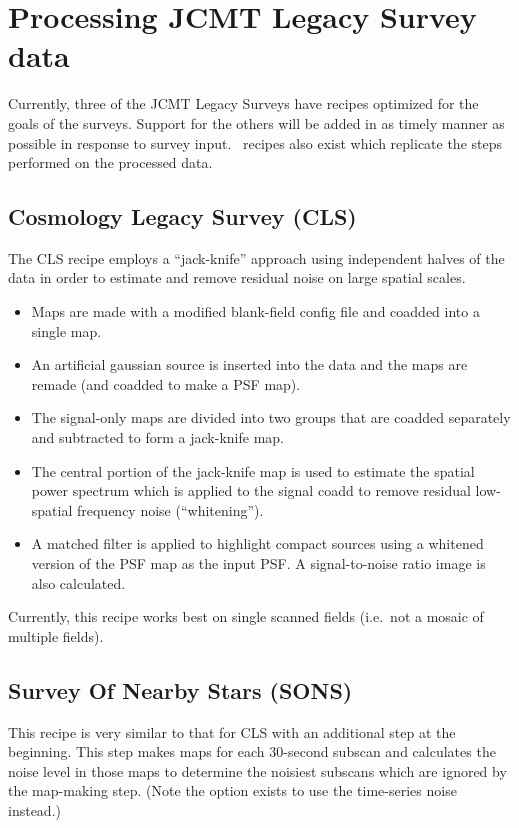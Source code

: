\section{Processing JCMT Legacy Survey data\label{se:jlsrec}}

Currently, three of the JCMT Legacy Surveys have recipes optimized for
the goals of the surveys. Support for the others will be added in as
timely manner as possible in response to survey
input. \picard\ recipes also exist which replicate the steps performed
on the processed data.

\subsection{Cosmology Legacy Survey (CLS)}

The CLS recipe employs a ``jack-knife'' approach using independent
halves of the data in order to estimate and remove residual noise on
large spatial scales.

\begin{itemize}
\item Maps are made with a modified blank-field config file and
  coadded into a single map.
\item An artificial gaussian source is inserted into the data and the
  maps are remade (and coadded to make a PSF map).
\item The signal-only maps are divided into two groups that are
  coadded separately and subtracted to form a jack-knife map.
\item The central portion of the jack-knife map is used to estimate
  the spatial power spectrum which is applied to the signal coadd to
  remove residual low-spatial frequency noise (``whitening'').
\item A matched filter is applied to highlight compact sources using a
  whitened version of the PSF map as the input PSF. A signal-to-noise
  ratio image is also calculated.
\end{itemize}

Currently, this recipe works best on single scanned fields (i.e.\ not
a mosaic of multiple fields).

\subsection{Survey Of Nearby Stars (SONS)}

This recipe is very similar to that for CLS with an additional step at
the beginning. This step makes maps for each 30-second subscan and
calculates the noise level in those maps to determine the noisiest
subscans which are ignored by the map-making step. (Note the option
exists to use the time-series noise instead.)

